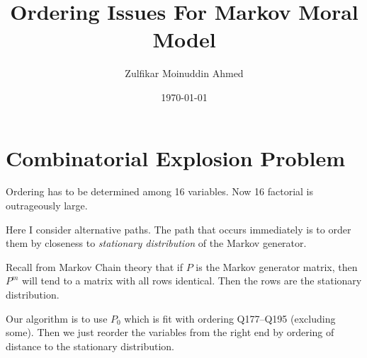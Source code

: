 \documentclass{amsart}
\title{Ordering Issues For Markov Moral Model}
\author{Zulfikar Moinuddin Ahmed}
\date{\today}
\begin{document}
\maketitle

\section{Combinatorial Explosion Problem}

Ordering has to be determined among 16 variables.  Now 16 factorial is outrageously large.

Here I consider alternative paths.  The path that occurs immediately is to order them by closeness to {\em stationary distribution} of the Markov generator. 

Recall from Markov Chain theory that if $P$ is the Markov generator matrix, then 
$P^m$ will tend to a matrix with all rows identical.  Then the rows are the stationary distribution.

Our algorithm is to use $P_0$ which is fit with ordering Q177--Q195 (excluding some).  Then we just reorder the variables from the right end by ordering of distance to the stationary distribution.
\end{document}
